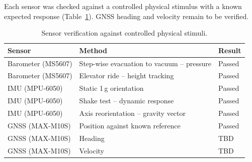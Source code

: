 Each sensor was checked against a controlled physical stimulus with a known
expected response (Table~\ref{tab:cdh-verification}). GNSS heading and
velocity remain to be verified.

\begin{table}[H]
\centering
\begin{tabular}{lll}
\toprule
\textbf{Sensor} & \textbf{Method} & \textbf{Result} \\
\midrule
Barometer (MS5607) & Step-wise evacuation to vacuum -- pressure & Passed \\
Barometer (MS5607) & Elevator ride -- height tracking          & Passed \\
IMU (MPU-6050)     & Static 1\,g orientation                   & Passed \\
IMU (MPU-6050)     & Shake test -- dynamic response            & Passed \\
IMU (MPU-6050)     & Axis reorientation -- gravity vector      & Passed \\
GNSS (MAX-M10S)    & Position against known reference          & Passed \\
GNSS (MAX-M10S)    & Heading                                   & TBD \\
GNSS (MAX-M10S)    & Velocity                                  & TBD \\
\bottomrule
\end{tabular}
\caption{Sensor verification against controlled physical stimuli.}
\label{tab:cdh-verification}
\end{table}
